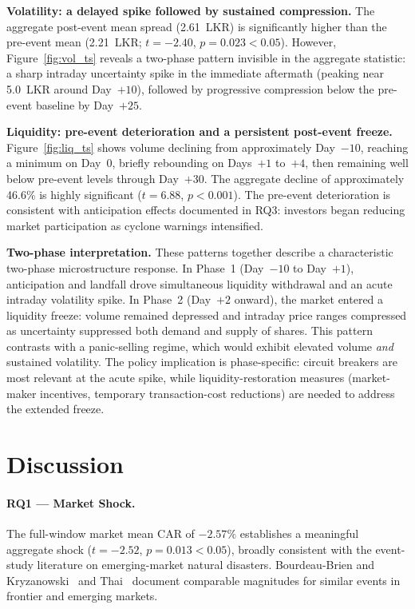 \documentclass[sigconf, nonacm]{acmart}
\begin{document}
\textbf{Volatility: a delayed spike followed by sustained compression.}
The aggregate post-event mean spread (2.61~LKR) is significantly higher
than the pre-event mean (2.21~LKR; $t=-2.40$, $p=0.023 < 0.05$). However,
Figure~\ref{fig:vol_ts} reveals a two-phase pattern invisible in the
aggregate statistic: a sharp intraday uncertainty spike in the immediate
aftermath (peaking near 5.0~LKR around Day~$+10$), followed by progressive
compression below the pre-event baseline by Day~$+25$.

\textbf{Liquidity: pre-event deterioration and a persistent post-event freeze.}
Figure~\ref{fig:liq_ts} shows volume declining from approximately
Day~$-10$, reaching a minimum on Day~0, briefly rebounding on Days~$+1$
to~$+4$, then remaining well below pre-event levels through Day~$+30$.
The aggregate decline of approximately 46.6\% is highly significant
($t=6.88$, $p < 0.001$). The pre-event deterioration is consistent with
anticipation effects documented in RQ3: investors began reducing market
participation as cyclone warnings intensified.

\textbf{Two-phase interpretation.} These patterns together describe a
characteristic two-phase microstructure response. In Phase~1 (Day~$-10$
to Day~$+1$), anticipation and landfall drove simultaneous liquidity
withdrawal and an acute intraday volatility spike. In Phase~2 (Day~$+2$
onward), the market entered a liquidity freeze: volume remained depressed
and intraday price ranges compressed as uncertainty suppressed both demand
and supply of shares. This pattern contrasts with a panic-selling regime,
which would exhibit elevated volume \emph{and} sustained volatility. The
policy implication is phase-specific: circuit breakers are most relevant
at the acute spike, while liquidity-restoration measures (market-maker
incentives, temporary transaction-cost reductions) are needed to address
the extended freeze.

\section{Discussion}

\paragraph{RQ1 --- Market Shock.}
The full-window market mean CAR of $-2.57\%$ establishes a meaningful
aggregate shock ($t=-2.52$, $p = 0.013 <0.05$), broadly consistent with the
event-study literature on emerging-market natural disasters. Bourdeau-Brien
and Kryzanowski~\cite{bourdeau2017} and Thai~\cite{thai2011} document
comparable magnitudes for similar events in frontier and emerging markets.
\end{document}
